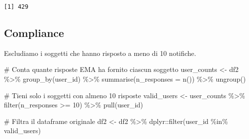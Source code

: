 \documentclass[
  11pt,
  a4paper,
  onecolumn]{article}
\newenvironment{Shaded}{}{}
\newcommand{\AttributeTok}[1]{\textcolor[rgb]{0.84,0.23,0.29}{#1}}
\newcommand{\CommentTok}[1]{\textcolor[rgb]{0.42,0.45,0.49}{#1}}
\newcommand{\DecValTok}[1]{\textcolor[rgb]{0.00,0.36,0.77}{#1}}
\newcommand{\FunctionTok}[1]{\textcolor[rgb]{0.44,0.26,0.76}{#1}}
\newcommand{\NormalTok}[1]{\textcolor[rgb]{0.14,0.16,0.18}{#1}}
\newcommand{\OtherTok}[1]{\textcolor[rgb]{0.44,0.26,0.76}{#1}}
\newcommand{\SpecialCharTok}[1]{\textcolor[rgb]{0.00,0.36,0.77}{#1}}
\newcommand{\StringTok}[1]{\textcolor[rgb]{0.01,0.18,0.38}{#1}}
\begin{document}
\begin{Shaded}
\end{Shaded}

\begin{verbatim}
[1] 429
\end{verbatim}

\subsection{Compliance}\label{compliance}

Escludiamo i soggetti che hanno risposto a meno di 10 notifiche.

\begin{Shaded}
\begin{Highlighting}[]
\CommentTok{\# Conta quante risposte EMA ha fornito ciascun soggetto}
\NormalTok{user\_counts }\OtherTok{\textless{}{-}}\NormalTok{ df2 }\SpecialCharTok{\%\textgreater{}\%}
  \FunctionTok{group\_by}\NormalTok{(user\_id) }\SpecialCharTok{\%\textgreater{}\%}
  \FunctionTok{summarise}\NormalTok{(}\AttributeTok{n\_responses =} \FunctionTok{n}\NormalTok{()) }\SpecialCharTok{\%\textgreater{}\%}
  \FunctionTok{ungroup}\NormalTok{()}

\CommentTok{\# Tieni solo i soggetti con almeno 10 risposte}
\NormalTok{valid\_users }\OtherTok{\textless{}{-}}\NormalTok{ user\_counts }\SpecialCharTok{\%\textgreater{}\%}
  \FunctionTok{filter}\NormalTok{(n\_responses }\SpecialCharTok{\textgreater{}=} \DecValTok{10}\NormalTok{) }\SpecialCharTok{\%\textgreater{}\%}
  \FunctionTok{pull}\NormalTok{(user\_id)}

\CommentTok{\# Filtra il dataframe originale}
\NormalTok{df2 }\OtherTok{\textless{}{-}}\NormalTok{ df2 }\SpecialCharTok{\%\textgreater{}\%}
\NormalTok{  dplyr}\SpecialCharTok{::}\FunctionTok{filter}\NormalTok{(user\_id }\SpecialCharTok{\%in\%}\NormalTok{ valid\_users)}
\end{Highlighting}
\end{Shaded}
\end{document}
